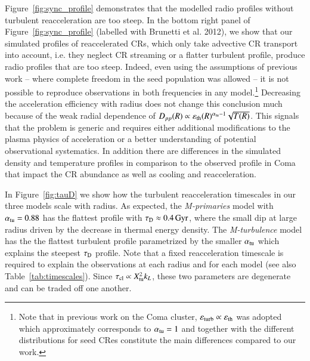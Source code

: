 \documentclass[fleqn,usenatbib,useAMS]{mnras}
\newcommand{\Mflatturb}{{\it M-turbulence}\xspace}
\newcommand{\Mprimary}{{\it M-primaries}\xspace}
\newcommand{\eps}{\varepsilon}
\begin{document}
Figure~\ref{fig:sync_profile} demonstrates that the modelled radio
profiles without turbulent reacceleration are too steep.  In the
bottom right panel of Figure~\ref{fig:sync_profile} (labelled with
Brunetti et al. 2012), we show that our simulated profiles of
reaccelerated CRs, which only take advective CR transport into
account, i.e. they neglect CR streaming or a flatter turbulent
profile, produce radio profiles that are too steep. Indeed, even using
the assumptions of previous work -- where complete freedom in the seed
population was allowed -- it is not possible to reproduce observations
in both frequencies in any model.\footnote{Note that in previous work
  on the Coma cluster, $\eps_\rmn{turb} \propto \eps_\rmn{th}$ was
  adopted which approximately corresponds to $\alpha_{\mathrm{tu}}= 1$
  \citep{brunetti12} and together with the different distributions for
  seed CRes constitute the main differences compared to our work.}
Decreasing the acceleration efficiency with radius does not change
this conclusion much because of the weak radial dependence of
$D_{pp}(R)\propto \eps_\rmn{th}(R)^{\alpha_\rmn{tu}-1}
\sqrt{T(R)}$. This signals that the problem is generic and requires
either additional modifications to the plasma physics of acceleration
or a better understanding of potential observational systematics. In
addition there are differences in the simulated density and
temperature profiles in comparison to the observed profile in Coma
that impact the CR abundance as well as cooling and reacceleration.

In Figure~\ref{fig:tauD} we show how the turbulent reacceleration
timescales in our three models scale with radius. As expected, the
\Mprimary model with $\alpha_{\mathrm{tu}}=0.88$ has the flattest profile
with $\tau_{\rm D}\approx0.4\,{\mathrm{Gyr}}$, where the small dip at large
radius driven by the decrease in thermal energy density. The
\Mflatturb model has the the flattest turbulent profile parametrized
by the smaller $\alpha_{\mathrm{tu}}$ which explains the steepest $\tau_{\rm D}$
profile. Note that a fixed reacceleration timescale is required to
explain the observations at each radius and for each model (see also
Table~\ref{tab:timescales}). Since $\tau_{\mathrm{cl}} \propto X_{\mathrm{tu}}^2 k_L$,
these two parameters are degenerate and can be traded off one another.
\end{document}
